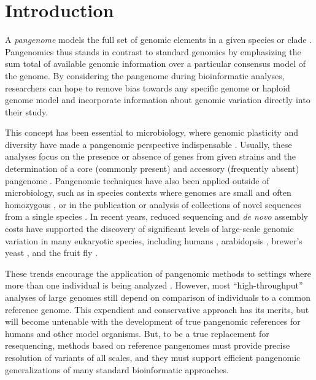 \section{Introduction}

A \emph{pangenome} models the full set of genomic elements in a given species or clade \cite{sigaux2000cancer}.
Pangenomics thus stands in contrast to standard genomics by emphasizing the sum total of available genomic information over a particular consensus model of the genome.
By considering the pangenome during bioinformatic analyses, researchers can hope to remove bias towards any specific genome or haploid genome model and incorporate information about genomic variation directly into their study.

This concept has been essential to microbiology, where genomic plasticity and diversity have made a pangenomic perspective indispensable \cite{tettelin2005genome,medini2005microbial}.
Usually, these analyses focus on the presence or absence of genes from given strains and the determination of a core (commonly present) and accessory (frequently absent) pangenome \cite{page2015roary}.
Pangenomic techniques have also been applied outside of microbiology, such as in species contexts where genomes are small and often homozygous \cite{cao2011whole}, or in the publication or analysis of collections of novel sequences from a single species \cite{gao2019tomato,brohammer2018maize}.
In recent years, reduced sequencing and \emph{de novo} assembly costs have supported the discovery of significant levels of large-scale genomic variation in many eukaryotic species, including humans \cite{li2010building,sudmant2010,sudmant2015integrated,chaisson2018multi,Yang_2019}, arabidopsis \cite{alonso2016arabidopsis}, brewer's yeast \cite{yue2017contrasting}, and the fruit fly \cite{chakraborty2018hidden}.

These trends encourage the application of pangenomic methods to settings where more than one individual is being analyzed \cite{computational2016computational}.
However, most ``high-throughput'' analyses of large genomes still depend on comparison of individuals to a common reference genome.
This expendient and conservative approach has its merits, but will become untenable with the development of true pangenomic references for humans and other model organisms.
But, to be a true replacement for resequencing, methods based on reference pangenomes must provide precise resolution of variants of all scales, and they must support efficient pangenomic generalizations of many standard bioinformatic approaches.

